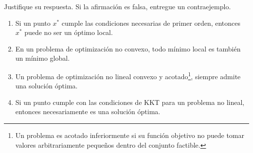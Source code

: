 Justifique su respuesta. Si la afirmación es falsa, entregue un contraejemplo.
\begin{enumerate}
    \item Si un punto $x^*$ cumple las condiciones necesarias de primer orden, entonces $x^*$ puede no ser un óptimo local.
    \item En un problema de optimización no convexo, todo mínimo local es también un mínimo global.
    \item Un problema de optimización no lineal convexo y acotado\footnote{Un problema es acotado inferiormente si su función objetivo no puede tomar valores arbitrariamente pequeños dentro del conjunto factible.}, siempre admite una solución óptima.
    \item Si un punto cumple con las condiciones de KKT para un problema no lineal, entonces necesariamente es una solución óptima.
\end{enumerate}
